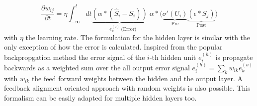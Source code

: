 \begin{equation}
\frac{\partial w_{ij}}{\partial t} = \eta \int_{-\infty}^{t} dt
\underbrace{\left(\alpha \ast (\hat{S}_i - S_i)\right)}_{= e^{(o)}_k \; \text{(Error)}} 
\; \alpha \ast 
\Big(\underbrace{\sigma'(U_i)}_{\text{Pre}} 
\underbrace{\left(\epsilon \ast S_j\right)}_{\text{Post}}\Big)
\end{equation}
with $\eta$ the learning rate. The formulation for the hidden layer is similar with the only exception of how the error is calculated. Inspired from the popular backpropgation method the error signal of the $i \text{-th}$ hidden unit $e^{(h)}_i$ is propagate backwards as a weighted sum over the all output error signal $e^{(h)}_i = \sum_{k} w_{ik} e^{(o)}_k$ with $w_{ik}$ the feed forward weights between the hidden and the output layer. A feedback alignment oriented approach with random weights is also possible. This formalism can be easily adapted for multiple hidden layers too.


%
